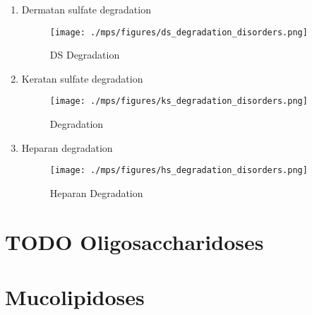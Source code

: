 \documentclass{scrartcl}
\begin{document}
\begin{enumerate}
\item Dermatan sulfate degradation
\label{sec:orgd7d0ed6}
\begin{figure}[htbp]
\centering
\texttt{[image: ./mps/figures/ds\_degradation\_disorders.png]}
\caption[DS Degradation]{\label{fig:org287fa3d}
DS Degradation}
\end{figure}


\item Keratan sulfate degradation
\label{sec:orge0ba1b6}

\begin{figure}[htbp]
\centering
\texttt{[image: ./mps/figures/ks\_degradation\_disorders.png]}
\caption[KS Degradation]{\label{fig:org51db357}
Degradation}
\end{figure}


\item Heparan degradation
\label{sec:org063bba6}

\begin{figure}[htbp]
\centering
\texttt{[image: ./mps/figures/hs\_degradation\_disorders.png]}
\caption[HS Degradation]{\label{fig:org5dd55dc}
Heparan Degradation}
\end{figure}
\end{enumerate}

\section{{\bfseries\sffamily TODO} Oligosaccharidoses}
\label{sec:org47766d2}

\section{Mucolipidoses}
\label{sec:org6c4fe8f}
\end{document}
